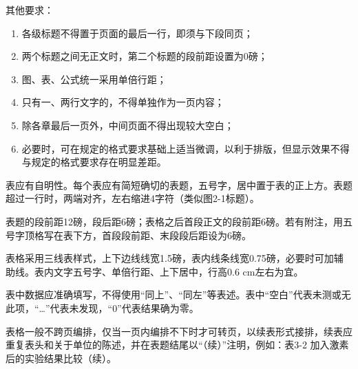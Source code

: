 其他要求：
\begin{enumerate}
    \item 各级标题不得置于页面的最后一行，即须与下段同页；
    \item 两个标题之间无正文时，第二个标题的段前距设置为0磅；
    \item 图、表、公式统一采用单倍行距；
    \item 只有一、两行文字的，不得单独作为一页内容；
    \item 除各章最后一页外，中间页面不得出现较大空白；
    \item 必要时，可在规定的格式要求基础上适当微调，以利于排版，但显示效果不得与规定的格式要求存在明显差距。
\end{enumerate}

表应有自明性。每个表应有简短确切的表题，五号字，居中置于表的正上方。表题超过一行时，两端对齐，左右缩进4字符（类似图2-1标题）。

表题的段前距12磅，段后距6磅；表格之后首段正文的段前距6磅。若有附注，用五号字顶格写在表下方，首段段前距、末段段后距设为6磅。

表格采用三线表样式，上下边线线宽1.5磅，表内线条线宽0.75磅，必要时可加辅助线。表内文字五号字、单倍行距、上下居中，行高0.6 cm左右为宜。

表中数据应准确填写，不得使用“同上”、“同左”等表述。表中“空白”代表未测或无此项，“…”代表未发现，“0”代表结果确为零。

表格一般不跨页编排，仅当一页内编排不下时才可转页，以续表形式接排，续表应重复表头和关于单位的陈述，并在表题结尾以“（续）”注明，例如：表3-2 加入激素后的实验结果比较（续）。


